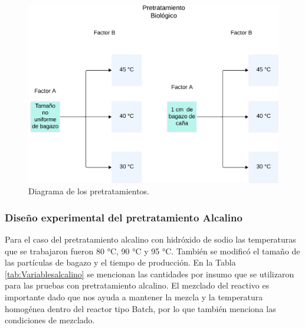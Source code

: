 \documentclass[12pt]{article}
\begin{document}
		\begin{figure} [h!]
			\centering
			\includegraphics[width=0.7\linewidth]{imagenes/diagramabiologico}
			\caption{Diagrama de los pretratamientos.}
			\label{Diagrama biologico}
		\end{figure}
		
		
		
		
		
	
		
	\subsubsection{ Diseño experimental del pretratamiento Alcalino}
	\label{Diseño factorial del pretratamiento alcalino}

Para el caso del pretratamiento alcalino con hidróxido de sodio las temperaturas que se trabajaron fueron 80 °C, 90 °C y 95 °C. También se modificó el tamaño de las partículas de bagazo y el tiempo de producción. En la Tabla \ref{tab:Variablesalcalino} se mencionan las cantidades por insumo que se utilizaron para las pruebas con pretratamiento alcalino. El mezclado del reactivo es importante dado que nos ayuda a mantener la mezcla y la temperatura homogénea dentro del reactor tipo Batch, por lo que también menciona las condiciones de mezclado.
\end{document}
